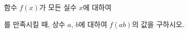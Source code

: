 함수 $f(x)$가 모든 실수 $x$에 대하여 \par\smallskip{}\par\smallskip\noindent 를 만족시킬 때, 상수 $a$, $b$에 대하여 $f(ab)$의 값을 구하시오.

